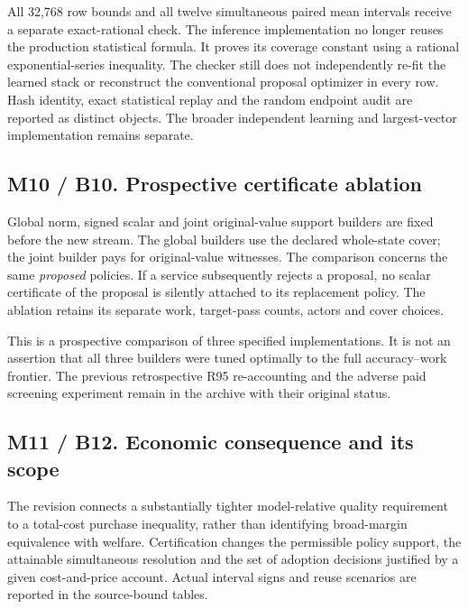 All 32,768 row bounds and all twelve simultaneous paired mean intervals
receive a separate exact-rational check. The inference implementation no
longer reuses the production statistical formula. It proves its coverage
constant using a rational exponential-series inequality. The checker
still does not independently re-fit the learned stack or reconstruct the
conventional proposal optimizer in every row. Hash identity, exact
statistical replay and the random endpoint audit are reported as
distinct objects. The broader independent learning and largest-vector
implementation remains separate.

\hypertarget{m10-b10.-prospective-certificate-ablation}{%
\subsection{M10 / B10. Prospective certificate
ablation}\label{m10-b10.-prospective-certificate-ablation}}

Global norm, signed scalar and joint original-value support builders are
fixed before the new stream. The global builders use the declared
whole-state cover; the joint builder pays for original-value witnesses.
The comparison concerns the same \emph{proposed} policies. If a service
subsequently rejects a proposal, no scalar certificate of the proposal
is silently attached to its replacement policy. The ablation retains its
separate work, target-pass counts, actors and cover choices.

This is a prospective comparison of three specified implementations. It
is not an assertion that all three builders were tuned optimally to the
full accuracy--work frontier. The previous retrospective R95
re-accounting and the adverse paid screening experiment remain in the
archive with their original status.

\hypertarget{m11-b12.-economic-consequence-and-its-scope}{%
\subsection{M11 / B12. Economic consequence and its
scope}\label{m11-b12.-economic-consequence-and-its-scope}}

The revision connects a substantially tighter model-relative quality
requirement to a total-cost purchase inequality, rather than identifying
broad-margin equivalence with welfare. Certification changes the
permissible policy support, the attainable simultaneous resolution and
the set of adoption decisions justified by a given cost-and-price
account. Actual interval signs and reuse scenarios are reported in the
source-bound tables.

